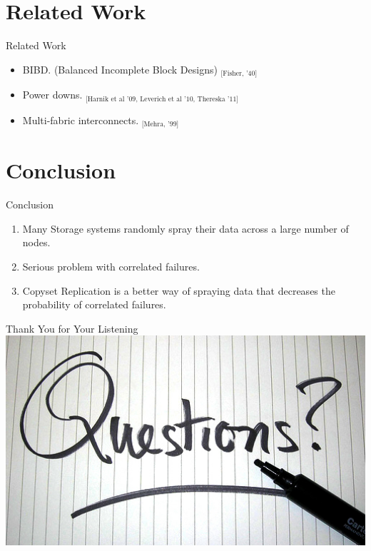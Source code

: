 \documentclass[xcolor=table]{beamer}
\begin{document}
	\section{Related Work}

	\begin{frame}{Related Work}
		\begin{itemize}
			\item BIBD. (Balanced Incomplete Block Designs) $_\text{[Fisher, '40]}$
			\item Power downs. $_\text{[Harnik et al '09, Leverich et al '10, Thereska '11]}$
			\item Multi-fabric interconnects. $_\text{[Mehra, '99]}$
		\end{itemize}
	\end{frame}

	\section{Conclusion}

	\begin{frame}{Conclusion}
		\begin{enumerate}
			\item Many Storage systems \alert{randomly} spray their data across a large number of nodes.
			\item Serious problem with \alert{correlated failures}.
			\item \alert{Copyset Replication} is a better way of spraying data that \alert{decreases the probability} of correlated failures.
		\end{enumerate}
	\end{frame}

	\begin{frame}{Thank You for Your Listening}
		\includegraphics[width=1\textwidth]{8.jpg}
	\end{frame}
\end{document}
